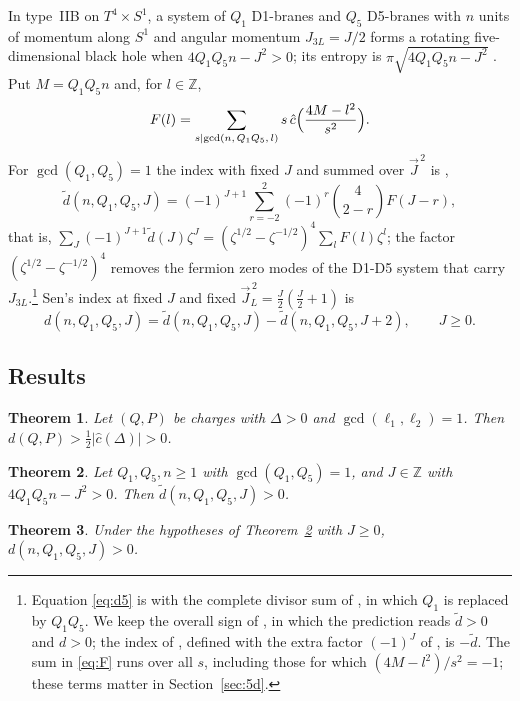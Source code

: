 \documentclass[11pt]{amsart}
\newtheorem{mainthm}{Theorem}
\theoremstyle{definition}
\newcommand{\ZZ}{\mathbb{Z}}
\newcommand{\cc}{\hat c}
\newcommand{\dt}{\tilde d}
\begin{document}
In type~IIB on $T^4\times S^1$, a system of $Q_1$ D1-branes and $Q_5$ D5-branes with $n$ units of momentum along $S^1$ and angular momentum $J_{3L}=J/2$ forms a rotating five-dimensional black hole when $4Q_1Q_5n-J^2>0$; its entropy is $\pi\sqrt{4Q_1Q_5n-J^2}$ \cite{BMPV97}. Put $M=Q_1Q_5n$ and, for $l\in\ZZ$,
\begin{equation}\label{eq:F}
F(l)=\sum_{s\mid \gcd(n,\,Q_1Q_5,\,l)}s\,\cc\Bigl(\frac{4M-l^2}{s^2}\Bigr).
\end{equation}
For $\gcd(Q_1,Q_5)=1$ the index with fixed $J$ and summed over $\vec J^{\,2}$ is \cite[(5.37)]{DGMS11}, \cite[(5.28)--(5.29)]{Sen12}
\begin{equation}\label{eq:d5}
\dt(n,Q_1,Q_5,J)=(-1)^{J+1}\sum_{r=-2}^{2}(-1)^r\binom{4}{2-r}F(J-r),
\end{equation}
that is, $\sum_J(-1)^{J+1}\dt(J)\zeta^J=(\zeta^{1/2}-\zeta^{-1/2})^4\sum_lF(l)\zeta^l$; the factor $(\zeta^{1/2}-\zeta^{-1/2})^4$ removes the fermion zero modes of the D1-D5 system that carry $J_{3L}$.\footnote{Equation \eqref{eq:d5} is \cite[(5.29)]{Sen12} with the complete divisor sum of \cite[(5.37)]{DGMS11}, in which $Q_1$ is replaced by $Q_1Q_5$. We keep the overall sign of \cite[(5.28)--(5.30)]{Sen12}, in which the prediction reads $\dt>0$ and $d>0$; the index of \cite[(5.37)]{DGMS11}, defined with the extra factor $(-1)^J$ of \cite{MMS99}, is $-\dt$. The sum in \eqref{eq:F} runs over all $s$, including those for which $(4M-l^2)/s^2=-1$; these terms matter in Section~\ref{sec:5d}.} Sen's index at fixed $J$ and fixed $\vec J_L^{\,2}=\tfrac J2(\tfrac J2+1)$ is \cite[(5.30)]{Sen12}
\begin{equation}\label{eq:drot}
d(n,Q_1,Q_5,J)=\dt(n,Q_1,Q_5,J)-\dt(n,Q_1,Q_5,J+2),\qquad J\ge0 .
\end{equation}

\subsection*{Results}
\begin{mainthm}\label{thm:A}
Let $(Q,P)$ be charges with $\Delta>0$ and $\gcd(\ell_1,\ell_2)=1$. Then $d(Q,P)>\tfrac12|\cc(\Delta)|>0$.
\end{mainthm}

\begin{mainthm}\label{thm:B}
Let $Q_1,Q_5,n\ge1$ with $\gcd(Q_1,Q_5)=1$, and $J\in\ZZ$ with $4Q_1Q_5n-J^2>0$. Then $\dt(n,Q_1,Q_5,J)>0$.
\end{mainthm}

\begin{mainthm}\label{thm:C}
Under the hypotheses of Theorem~\ref{thm:B} with $J\ge0$, $d(n,Q_1,Q_5,J)>0$.
\end{mainthm}
\end{document}
